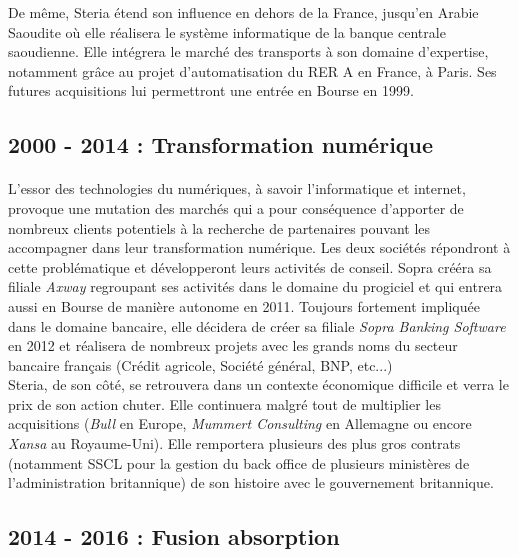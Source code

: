 De même, Steria étend son influence en dehors de la France, jusqu'en Arabie Saoudite où elle réalisera le système informatique de la banque centrale saoudienne. Elle intégrera le marché des transports à son domaine d'expertise, notamment grâce au projet d'automatisation du RER A en France, à Paris. Ses futures acquisitions lui permettront une entrée en Bourse en 1999.\\

\subsection{2000 - 2014 : Transformation numérique}

\paragraph{}
L'essor des technologies du numériques, à savoir l'informatique et internet, provoque une mutation des marchés qui a pour conséquence d'apporter de nombreux clients potentiels à la recherche de partenaires pouvant les accompagner dans leur transformation numérique. Les deux sociétés répondront à cette problématique et développeront leurs activités de conseil. Sopra crééra sa filiale \textit{Axway} regroupant ses activités dans le domaine du progiciel et qui entrera aussi en Bourse de manière autonome en 2011. Toujours fortement impliquée dans le domaine bancaire, elle décidera de créer sa filiale \textit{Sopra Banking Software} en 2012 et réalisera de nombreux projets avec les grands noms du secteur bancaire français (Crédit agricole, Société général, BNP, etc...)\\

Steria, de son côté, se retrouvera dans un contexte économique difficile et verra le prix de son action chuter. Elle continuera malgré tout de multiplier les acquisitions (\textit{Bull} en Europe, \textit{Mummert Consulting} en Allemagne ou encore \textit{Xansa} au Royaume-Uni). Elle remportera plusieurs des plus gros contrats (notamment SSCL pour la gestion du back office de plusieurs ministères de l'administration britannique) de son histoire avec le gouvernement britannique.

\subsection{2014 - 2016 : Fusion absorption}

\paragraph{}

